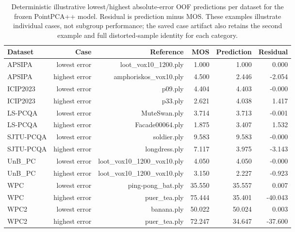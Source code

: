 \begin{table}[t!]
\centering
\caption{Deterministic illustrative lowest/highest absolute-error OOF predictions per dataset for the frozen PointPCA++ model. Residual is prediction minus MOS. These examples illustrate individual cases, not subgroup performance; the saved case artifact also retains the second example and full distorted-sample identity for each category.}
\label{tab_review_cases}
\scriptsize
\begin{adjustbox}{max width=\textwidth}
\begin{tabular}{lrrrrr}
\toprule
Dataset & Case & Reference & MOS & Prediction & Residual \\
\midrule
APSIPA & lowest error & loot\_vox10\_1200.ply & 1.000 & 1.000 & 0.000 \\
APSIPA & highest error & amphoriskos\_vox10.ply & 4.500 & 2.446 & -2.054 \\
ICIP2023 & lowest error & p09.ply & 4.404 & 4.403 & -0.000 \\
ICIP2023 & highest error & p33.ply & 2.621 & 4.038 & 1.417 \\
LS-PCQA & lowest error & MuteSwan.ply & 3.714 & 3.713 & -0.001 \\
LS-PCQA & highest error & Facade00064.ply & 1.875 & 3.407 & 1.532 \\
SJTU-PCQA & lowest error & soldier.ply & 9.583 & 9.583 & -0.000 \\
SJTU-PCQA & highest error & longdress.ply & 7.117 & 3.975 & -3.143 \\
UnB\_PC & lowest error & loot\_vox10\_1200\_vox10.ply & 4.050 & 4.050 & -0.000 \\
UnB\_PC & highest error & loot\_vox10\_1200\_vox10.ply & 3.150 & 2.227 & -0.923 \\
WPC & lowest error & ping-pong\_bat.ply & 35.550 & 35.557 & 0.007 \\
WPC & highest error & puer\_tea.ply & 75.444 & 35.401 & -40.043 \\
WPC2 & lowest error & banana.ply & 50.022 & 50.024 & 0.003 \\
WPC2 & highest error & puer\_tea.ply & 72.247 & 34.647 & -37.600 \\
\bottomrule
\end{tabular}
\end{adjustbox}
\end{table}
